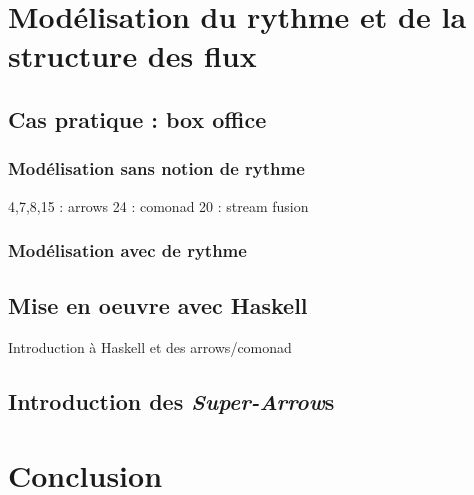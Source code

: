 \documentclass{llncs}
\newcommand{\SAs}{\emph{Super-Arrow}s }
\begin{document}
\section{Modélisation du rythme et de la structure des flux}
\subsection{Cas pratique : box office}
\subsubsection{Modélisation sans notion de rythme}
4,7,8,15 : arrows
24 : comonad
20 : stream fusion

\subsubsection{Modélisation avec de rythme}
\subsection{Mise en oeuvre avec Haskell}
Introduction à Haskell et des arrows/comonad
\subsection{Introduction des \SAs}

\section{Conclusion}





\end{document}
